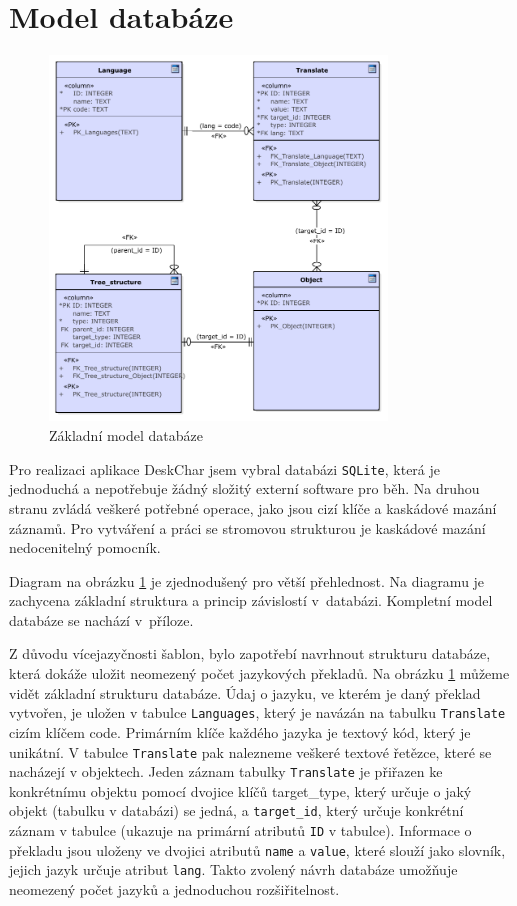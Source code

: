 \documentclass[thesis=B,czech]{resources/FITthesis}[2012/06/26]
\begin{document}
	\section{Model databáze}
	\begin{figure}\centering
	\includegraphics[width=0.8\textwidth]{images/basic_database}
	\caption[Základní model databáze]{Základní model databáze}\label{fig:db_basic}
	\end{figure}
	Pro realizaci aplikace DeskChar jsem vybral databázi \texttt{SQLite}, která je jednoduchá a nepotřebuje žádný složitý externí software pro běh. Na druhou stranu zvládá veškeré potřebné operace, jako jsou cizí klíče a kaskádové mazání záznamů. Pro vytváření a práci se stromovou strukturou je kaskádové mazání nedocenitelný pomocník. \par

Diagram na obrázku \ref{fig:db_basic} je zjednodušený pro větší přehlednost. Na diagramu je zachycena základní struktura a princip závislostí v~databázi. Kompletní model databáze se nachází v~příloze.\par

Z důvodu vícejazyčnosti šablon, bylo zapotřebí navrhnout strukturu databáze, která dokáže uložit neomezený počet jazykových překladů. Na obrázku \ref{fig:db_basic} můžeme vidět základní strukturu databáze. Údaj o jazyku, ve kterém je daný překlad vytvořen, je uložen v tabulce \texttt{Languages}, který je navázán na tabulku \texttt{Translate} cizím klíčem code. Primárním klíče každého jazyka je textový kód, který je unikátní. V tabulce \texttt{Translate} pak nalezneme veškeré textové řetězce, které se nacházejí v objektech. Jeden záznam tabulky \texttt{Translate} je přiřazen ke konkrétnímu objektu pomocí dvojice klíčů target\_type, který určuje o jaký objekt (tabulku v databázi) se jedná, a \texttt{target\_id}, který určuje konkrétní záznam v tabulce (ukazuje na primární atributů \texttt{ID} v tabulce). Informace o překladu jsou uloženy ve dvojici atributů \texttt{name} a \texttt{value}, které slouží jako slovník, jejich jazyk určuje atribut \texttt{lang}. Takto zvolený návrh databáze umožňuje neomezený počet jazyků a jednoduchou rozšiřitelnost.\par
\end{document}
